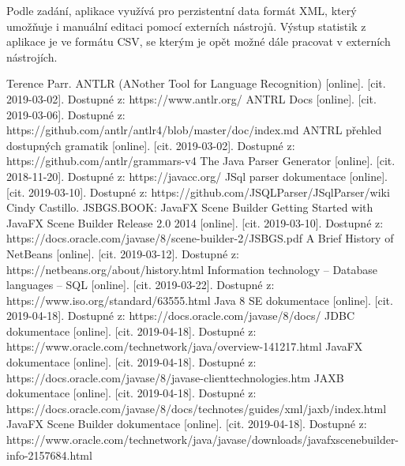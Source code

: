 \documentclass[czech,bachelor,public,dept460,male,cpdeclaration,twoside]{diploma}
\begin{document}
Podle zadání, aplikace využívá pro perzistentní data formát XML, který umožňuje i manuální editaci pomocí externích nástrojů. Výstup statistik z aplikace je ve formátu CSV, se kterým je opět možné dále pracovat v externích nástrojích. 

































\begin{thebibliography}{99}
	 Terence Parr. ANTLR (ANother Tool for Language Recognition) [online]. [cit. 2019-03-02]. Dostupné z: https://www.antlr.org/
	 ANTRL Docs [online]. [cit. 2019-03-06]. Dostupné z: https://github.com/antlr/antlr4/blob/master/doc/index.md
	 ANTRL přehled dostupných gramatik [online]. [cit. 2019-03-02]. Dostupné z: https://github.com/antlr/grammars-v4
	 The Java Parser Generator [online]. [cit. 2018-11-20]. Dostupné z: https://javacc.org/
	 JSql parser dokumentace [online]. [cit. 2019-03-10]. Dostupné z: https://github.com/JSQLParser/JSqlParser/wiki
	 Cindy Castillo. JSBGS.BOOK: JavaFX Scene Builder Getting Started with JavaFX Scene Builder Release 2.0 2014 [online]. [cit. 2019-03-10]. Dostupné z: https://docs.oracle.com/javase/8/scene-builder-2/JSBGS.pdf
	 A Brief History of NetBeans [online]. [cit. 2019-03-12]. Dostupné z: https://netbeans.org/about/history.html
	 Information technology -- Database languages -- SQL [online]. [cit. 2019-03-22]. Dostupné z: https://www.iso.org/standard/63555.html
	 Java 8 SE dokumentace [online]. [cit. 2019-04-18]. Dostupné z: https://docs.oracle.com/javase/8/docs/
	 JDBC dokumentace [online]. [cit. 2019-04-18]. Dostupné z: https://www.oracle.com/technetwork/java/overview-141217.html
	 JavaFX dokumentace [online]. [cit. 2019-04-18]. Dostupné z: https://docs.oracle.com/javase/8/javase-clienttechnologies.htm
	 JAXB dokumentace [online]. [cit. 2019-04-18]. Dostupné z: https://docs.oracle.com/javase/8/docs/technotes/guides/xml/jaxb/index.html
	 JavaFX Scene Builder dokumentace [online]. [cit. 2019-04-18]. Dostupné z: https://www.oracle.com/technetwork/java/javase/downloads/javafxscenebuilder-info-2157684.html
	
	
	
	
	
	
	
	
	
	
	
	
	
	
\end{thebibliography}
\end{document}
